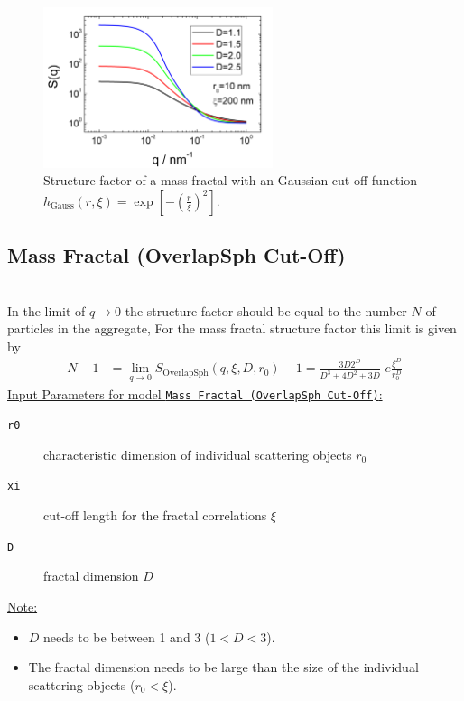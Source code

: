 \begin{figure}[htb]
\begin{center}
\includegraphics[width=0.6\textwidth]{../images/structure_factor/MassFractals/SQGaussCutOff.png}
\end{center}
\caption{Structure factor of a mass fractal with an Gaussian
cut-off function $h_\text{Gauss}(r,\xi) = \exp\left[-\left(\tfrac{r}{\xi}\right)^2\right]$.}
\label{fig:SQGaussCutOff}
\end{figure}


\clearpage
\subsection{Mass Fractal (OverlapSph Cut-Off)}
~\\
In the limit of $q \to 0$ the structure factor should be equal to the number $N$ of particles in the aggregate, For the mass fractal structure factor this limit is given by
\begin{align}\label{eq:fractalGauss}
  N-1 & =\lim_{q\to 0}  S_\text{OverlapSph}(q,\xi,D,r_0)-1 = \frac{3D 2^D}{D^3+4D^2+3D} \,\, e\frac{\xi^D}{r_0^D}
\end{align}
\uline{Input Parameters for model \texttt{Mass Fractal (OverlapSph Cut-Off)}:}
\begin{description}
\item[\texttt{r0}] characteristic dimension of individual scattering objects $r_0$
\item[\texttt{xi}] cut-off length for the fractal correlations $\xi$
\item[\texttt{D}] fractal dimension $D$
\end{description}

\uline{Note:}
\begin{itemize}
\item $D$ needs to be between 1 and 3 ($1<D<3$).
\item The fractal dimension needs to be large than the size of the individual scattering objects ($r_0 < \xi$).
\end{itemize}

